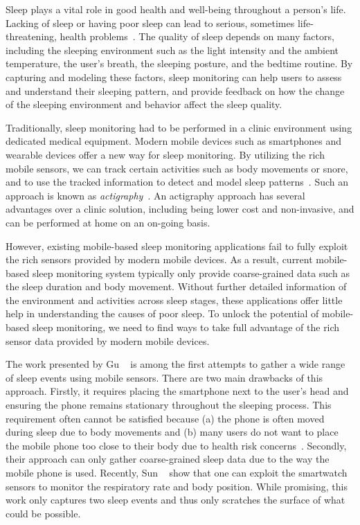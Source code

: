 Sleep plays a vital role in good health and well-being throughout a person's life. Lacking of sleep or having poor sleep can lead to
serious, sometimes life-threatening, health problems~\cite{altena2008sleep,chandola2010effect,lallukka2016contribution}. The quality of
sleep depends on many factors, including the sleeping environment such as the light intensity and the ambient temperature, the user's
breath, the sleeping posture, and the bedtime routine. By capturing and modeling these factors, sleep monitoring can help users to assess
and understand their sleeping pattern, and provide feedback on how the change of the sleeping environment and behavior affect the sleep
quality.

Traditionally, sleep monitoring had to be performed in a clinic environment using dedicated medical equipment.  Modern mobile devices such
as smartphones and wearable devices offer a new way for sleep monitoring. By utilizing the rich mobile sensors, we can track certain
activities such as body movements or snore, and to use the tracked information to detect and model sleep
patterns~\cite{zeo,Jawbone,SleepAndroid,fitbit,gu2016sleep}. Such an approach is known as
\emph{actigraphy}~\cite{Actigraphy,ancoli2003role}. An actigraphy approach has several advantages over a clinic solution, including being
lower cost and non-invasive, and can be performed at home on an on-going basis.


However, existing mobile-based sleep monitoring applications fail to fully exploit the rich sensors provided by modern mobile devices. As a
result, current mobile-based sleep monitoring system typically only provide coarse-grained data such as the sleep duration and body
movement. Without further detailed information of the environment and activities across sleep stages, these applications offer little help
in understanding the causes of poor sleep. To unlock the potential of mobile-based sleep monitoring, we need to find ways to take full
advantage of the rich sensor data provided by modern mobile devices.


The work presented by Gu \etal~\cite{gu2016sleep} is among the first attempts to gather  a wide range of sleep events using mobile sensors.
There are two main drawbacks of this approach. Firstly, it requires placing the smartphone next to the user's head and ensuring the phone
remains stationary throughout the sleeping process. This requirement often cannot be satisfied because (a) the phone is often moved during
sleep due to body movements and (b) many users do not want to place the mobile phone too close to their body due to health risk
concerns~\cite{StepHealth,Quorasleep}.  Secondly, their approach can only gather coarse-grained sleep data due to the way the mobile phone
is used. Recently, Sun \etal~\cite{sleepmonitor} show that one can exploit the smartwatch sensors to monitor the respiratory  rate and body
position. While promising, this work only captures two sleep events and thus only scratches the surface of what could be possible.


